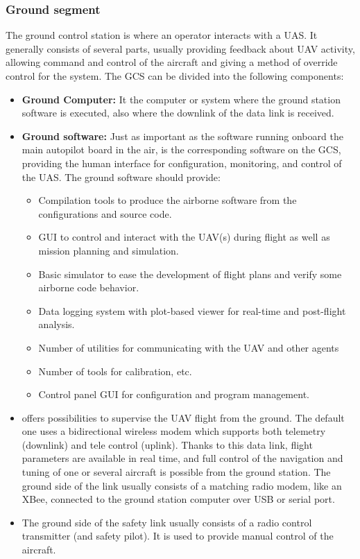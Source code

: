\subsubsection{Ground segment} 
The ground control station is where an operator interacts with a UAS. It generally consists of several parts, usually providing feedback about UAV activity, allowing command and control of the aircraft and giving a method of override control for the system.
The GCS can be divided into the following components:
\begin{itemize}
    \item \textbf{Ground Computer:} It the computer or system where the ground station software is executed, also where the downlink of the data link is received.
    \item \textbf{Ground software:} Just as important as the software running onboard the main autopilot board in the air, is the corresponding software on the GCS, providing the human interface for configuration, monitoring, and control of the UAS. The ground software should provide:
    \begin{itemize}
        \item Compilation tools to produce the airborne software from the configurations and source code.
        \item GUI to control and interact with the UAV(s) during flight as well as mission planning and simulation.
        \item Basic simulator to ease the development of flight plans and verify some airborne code behavior.
        \item Data logging system with plot-based viewer for real-time and post-flight analysis.
        \item Number of utilities for communicating with the UAV and other agents
        \item Number of tools for calibration, etc.
        \item Control panel GUI for configuration and program management.
    \end{itemize}
    \item {} offers possibilities to supervise the UAV flight from the ground. The default one uses a bidirectional wireless modem which supports both telemetry (downlink) and tele control (uplink). Thanks to this data link, flight parameters are available in real time, and full control of the navigation and tuning of one or several aircraft is possible from the ground station. The ground side of the link usually consists of a matching radio modem, like an XBee, connected to the ground station computer over USB or serial port.
    \item {} The ground side of the safety link usually consists of a radio control transmitter (and safety pilot). It is used to provide manual control of the aircraft.
\end{itemize}
